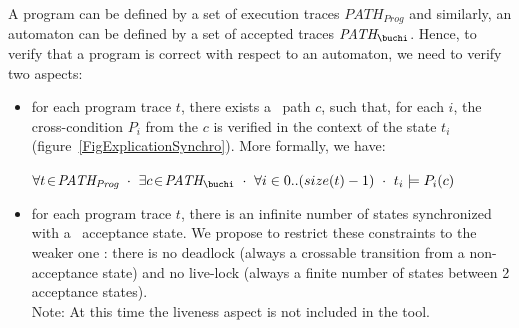 \documentclass{frama-c-book}
\begin{document}
A program can be defined by a set of execution traces
$\textit{PATH}_{\textit{Prog}}$ and similarly, an automaton can be defined by a
set of accepted traces $\textit{PATH}_{\buchi}$. Hence, to verify that a program
is correct with respect to an automaton, we need to verify two aspects:
\begin{itemize}
  \item[Safety] for each program trace $t$, there exists a \buchi\ path $c$,
    such that, for each $i$, the cross-condition $P_i$ from the $c$ is verified
    in the context of the state $t_i$ (figure~\ref{FigExplicationSynchro}). More
    formally, we have:

    \centerline{
      $\forall t \!\in\! \textit{PATH}_{\textit{Prog}} ~\cdot~ \exists c \!\in\!
      \textit{PATH}_{\buchi} ~\cdot~ \forall i\in 0..(size(t)-1) ~\cdot~ t_i
      \models P_i(c)$
    }


  \item[Liveness] for each program trace $t$, there is an infinite number of
    states synchronized with a \buchi\ acceptance state. We propose to restrict
    these constraints to the weaker one : there is no deadlock (always a
    crossable transition from a non-acceptance state) and no live-lock (always a
    finite number of states between 2 acceptance states).\\
  Note: At this time the liveness aspect is not included in the tool.

\end{itemize}
\end{document}

